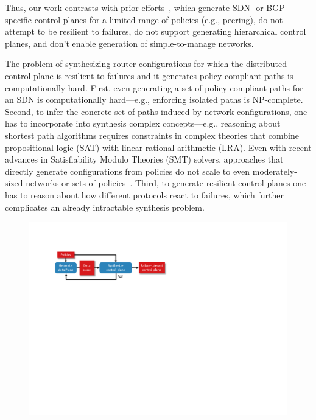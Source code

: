 Thus, our work contrasts with prior efforts~\cite{netegg, propane,
  merlin, simple, fattire, netkat, netkatcompiler, sol}, which
generate SDN- or BGP-specific control planes for a limited range of
policies (e.g., peering), do not attempt to be resilient to failures,
do not support generating hierarchical control planes, and don't
enable generation of simple-to-manage networks.

The problem of synthesizing router configurations for which the
distributed control plane is resilient to failures and it generates
policy-compliant paths is computationally hard.  First, even
generating a set of policy-compliant paths for an SDN is
computationally hard---e.g., enforcing isolated paths is NP-complete.
Second, to infer the concrete set of paths induced by network
configurations, one has to incorporate into synthesis complex
concepts---e.g., reasoning about shortest path algorithms requires
constraints in complex theories that combine propositional logic (SAT)
with linear rational arithmetic (LRA). Even with recent advances in
Satisfiability Modulo Theories (SMT) solvers, approaches that directly
generate configurations from policies do not scale to even
moderately-sized networks or sets of policies~\cite{synet}.  Third, to
generate resilient control planes one has to reason about how
different protocols react to failures, which further complicates an
already intractable synthesis problem.

\begin{figure}
	\includegraphics[width=\linewidth]{figures/architecture.pdf}
	\label{fig:architecture}
\end{figure}

